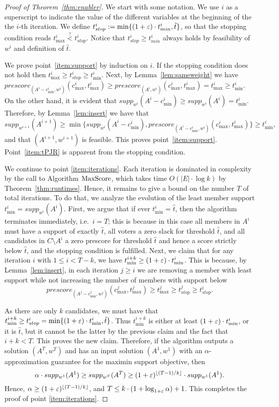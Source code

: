 \begin{proof}[Proof of Theorem~\ref{thm:enabler}]
We start with some notation. We use $i$ as a superscript to indicate the value of the different variables at the beginning of the the $i$-th iteration. We define $t^i_{stop}:=\min\{(1+\varepsilon)\cdot t^i_{min}, \hat{t}\}$, so that the stopping condition reads $t^i_{\max} \stackrel{?}{<} t^i_{stop}$. Notice that $t^i_{stop}\geq t^i_{min}$ always holds by feasibility of $w^i$ and definition of $\hat{t}$. 

We prove point~\ref{item:support} by induction on $i$. 
If the stopping condition does not hold then $t^i_{\max} \geq t^i_{stop}\geq t^i_{\min}$. 
Next, by Lemma~\ref{lem:sameweight} we have $prescore_{(A^i-c_{\min}^i, w^i)}(c^i_{\max}, t^i_{\max}) \geq prescore_{(A^i, w^i)}(c^i_{\max}, t^i_{\max})=t^i_{\max}\geq t^i_{\min}$. 
On the other hand, it is evident that $supp_{w^i}(A^i-c^i_{\min})\geq supp_{w^i}(A^i)=t^i_{\min}$. 
Therefore, by Lemma~\ref{lem:insert} we have that  
$$supp_{w^{i+1}}(A^{i+1})\geq \min\{supp_{w^i}(A^i-c^i_{\min}), prescore_{(A^i-c_{\min}^i, w^i)}(c^i_{\max}, t^i_{\max})\} \geq t^i_{\min},$$
and that $(A^{i+1},w^{i+1})$ is feasible.  
This proves point~\ref{item:support}. Point~\ref{item:tPJR} is apparent from the stopping condition. 

We continue to point \ref{item:iterations}. Each iteration is dominated in complexity by the call to Algorithm $\operatorname{MaxScore}$, which takes time $O(|E|\cdot \log k)$ by Theorem~\ref{thm:runtimes}. 
Hence, it remains to give a bound on the number $T$ of total iterations. 
To do that, we analyze the evolution of the least member support $t^i_{\min}=supp_{w^i}(A^i)$. First, we argue that if ever $t^i_{\min}=\hat{t}$, then the algorithm terminates immediately, i.e.~$i=T$; this is because in this case all members in $A^i$ must have a support of exactly $\hat{t}$, all voters a zero slack for threshold $\hat{t}$, and all candidates in $C\setminus A^i$ a zero prescore for threshold $\hat{t}$ and hence a score strictly below $\hat{t}$, and the stopping condition is fulfilled.
Next, we claim that for any iteration $i$ with $1\leq i<T-k$, we have $t^{i+k}_{\min}\geq (1+\varepsilon)\cdot t^{i}_{\min}$. This is because, by Lemma~\ref{lem:insert}, in each iteration $j\geq i$ we are removing a member with least support while not increasing the number of members with support below 
$$prescore_{(A^j - c^j_{\min}, w^j)}(c^j_{\max}, t^j_{\max})\geq t^j_{\max}\geq t^j_{stop}\geq t^i_{stop}.$$
 
As there are only $k$ candidates, we must have that 
$t^{i+k}_{\min}\geq t^i_{stop}=\min\{(1+\varepsilon)\cdot t^i_{\min}, \hat{t}\}$. 
Thus $t^{i+k}_{\min}$ is either at least $(1+\varepsilon)\cdot t^i_{\min}$, or it is $\hat{t}$, but it cannot be the latter by the previous claim and the fact that $i+k<T$. This proves the new claim. Therefore, if the algorithm outputs a solution $(A^T,w^T)$ and has an input solution $(A^1, w^1)$ with an $\alpha$-approximation guarantee for the maximin support objective, then 
$$\alpha\cdot supp_{w^1}(A^1) \geq supp_{w^T}(A^T) \geq (1+\varepsilon)^{\lfloor (T-1)/k \rfloor} \cdot supp_{w^1}(A^1).$$
Hence, $\alpha\geq (1+\varepsilon)^{\lfloor (T-1)/k \rfloor}$, and $T\leq k\cdot(1+\log_{1+\varepsilon} \alpha)+1$. This completes the proof of point \ref{item:iterations}.


\end{proof}
